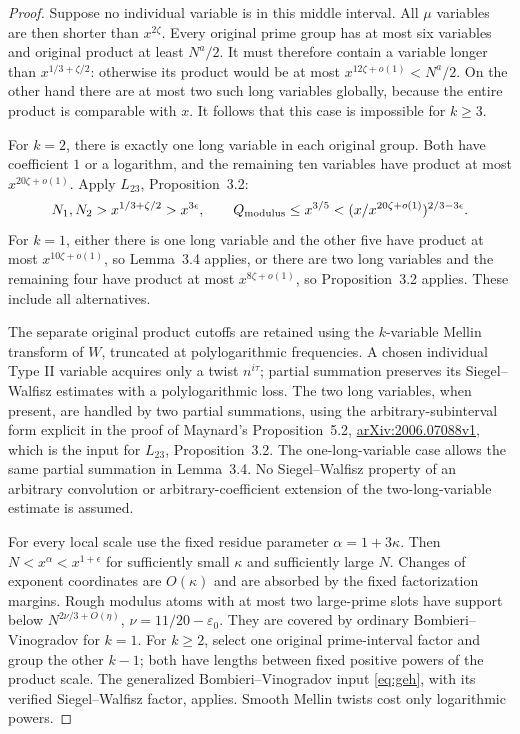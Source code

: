 \begin{proof}
Suppose no individual variable is in this middle interval.
All $\mu$ variables are then shorter than $x^{2\zeta}$.
Every original prime group has at most six variables and
original product at least $N^a/2$. It must therefore contain
a variable longer than $x^{1/3+\zeta/2}$: otherwise its
product would be at most $x^{12\zeta+o(1)}<N^a/2$.
On the other hand there are at most two such long variables
globally, because the entire product is comparable with $x$.
It follows that this case is impossible for $k\ge3$.

For $k=2$, there is exactly one long variable in each original
group. Both have coefficient $1$ or a logarithm, and the
remaining ten variables have product at most $x^{20\zeta+o(1)}$.
Apply $L_{23}$, Proposition~3.2:
\[
 N_1,N_2>x^{1/3+\zeta/2}>x^{3\epsilon},
 \qquad
 Q_{\rm modulus}\le x^{3/5}
       <(x/x^{20\zeta+o(1)})^{2/3-3\epsilon}.
\]
For $k=1$, either there is one long variable and the other
five have product at most $x^{10\zeta+o(1)}$, so Lemma~3.4
applies, or there are two long variables and the remaining
four have product at most $x^{8\zeta+o(1)}$, so
Proposition~3.2 applies. These include all alternatives.

The separate original product cutoffs are retained using
the $k$-variable Mellin transform of $W$, truncated at
polylogarithmic frequencies. A chosen individual Type II
variable acquires only a twist $n^{i\tau}$; partial summation
preserves its Siegel--Walfisz estimates with a polylogarithmic
loss. The two long variables, when present, are handled by
two partial summations, using the arbitrary-subinterval form
explicit in the proof of Maynard's Proposition~5.2,
\href{https://arxiv.org/pdf/2006.07088v1}
{arXiv:2006.07088v1}, which is the input for $L_{23}$,
Proposition~3.2.
The one-long-variable case allows the same partial summation
in Lemma~3.4.
No Siegel--Walfisz property of an arbitrary convolution or
arbitrary-coefficient extension of the two-long-variable
estimate is assumed.

For every local scale use the fixed residue parameter
$\alpha=1+3\kappa$. Then $N<x^\alpha<x^{1+\epsilon}$
for sufficiently small $\kappa$ and sufficiently large $N$.
Changes of exponent coordinates are $O(\kappa)$ and are
absorbed by the fixed factorization margins.
Rough modulus atoms with at most two large-prime slots have
support below $N^{2\nu/3+O(\eta)}$, $\nu=11/20-\varepsilon_0$.
They are covered by ordinary Bombieri--Vinogradov for $k=1$.
For $k\ge2$, select one original prime-interval factor and
group the other $k-1$; both have lengths between fixed
positive powers of the product scale. The generalized
Bombieri--Vinogradov input \eqref{eq:geh}, with its verified
Siegel--Walfisz factor, applies. Smooth Mellin twists cost
only logarithmic powers.


\end{proof}
